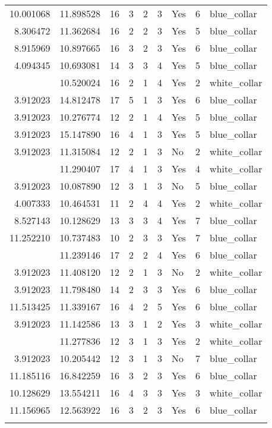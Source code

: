 \documentclass[
]{article}
\begin{document}
\begin{longtable}[t]{rrrrrllrl}
10.001068 & 11.898528 & 16 & 3 & 2 & 3 & Yes & 6 & blue\_collar\\
8.306472 & 11.362684 & 16 & 2 & 2 & 3 & Yes & 5 & blue\_collar\\
8.915969 & 10.897665 & 16 & 3 & 2 & 3 & Yes & 6 & blue\_collar\\
4.094345 & 10.693081 & 14 & 3 & 3 & 4 & Yes & 5 & blue\_collar\\
\addlinespace
3.912023 & 10.520024 & 16 & 2 & 1 & 4 & Yes & 2 & white\_collar\\
3.912023 & 14.812478 & 17 & 5 & 1 & 3 & Yes & 6 & blue\_collar\\
3.912023 & 10.276774 & 12 & 2 & 1 & 4 & Yes & 5 & blue\_collar\\
3.912023 & 15.147890 & 16 & 4 & 1 & 3 & Yes & 5 & blue\_collar\\
3.912023 & 11.315084 & 12 & 2 & 1 & 3 & No & 2 & white\_collar\\
\addlinespace
3.912023 & 11.290407 & 17 & 4 & 1 & 3 & Yes & 4 & white\_collar\\
3.912023 & 10.087890 & 12 & 3 & 1 & 3 & No & 5 & blue\_collar\\
4.007333 & 10.464531 & 11 & 2 & 4 & 4 & Yes & 2 & white\_collar\\
8.527143 & 10.128629 & 13 & 3 & 3 & 4 & Yes & 7 & blue\_collar\\
11.252210 & 10.737483 & 10 & 2 & 3 & 3 & Yes & 7 & blue\_collar\\
\addlinespace
8.527143 & 11.239146 & 17 & 2 & 2 & 4 & Yes & 6 & blue\_collar\\
3.912023 & 11.408120 & 12 & 2 & 1 & 3 & No & 2 & white\_collar\\
3.912023 & 11.798480 & 14 & 2 & 3 & 3 & Yes & 6 & blue\_collar\\
11.513425 & 11.339167 & 16 & 4 & 2 & 5 & Yes & 6 & blue\_collar\\
3.912023 & 11.142586 & 13 & 3 & 1 & 2 & Yes & 3 & white\_collar\\
\addlinespace
3.912023 & 11.277836 & 12 & 3 & 1 & 3 & Yes & 2 & white\_collar\\
3.912023 & 10.205442 & 12 & 3 & 1 & 3 & No & 7 & blue\_collar\\
11.185116 & 16.842259 & 16 & 3 & 2 & 3 & Yes & 6 & blue\_collar\\
10.128629 & 13.554211 & 16 & 4 & 3 & 3 & Yes & 3 & white\_collar\\
11.156965 & 12.563922 & 16 & 3 & 2 & 3 & Yes & 6 & blue\_collar\\
\addlinespace

\end{longtable}
\end{document}
